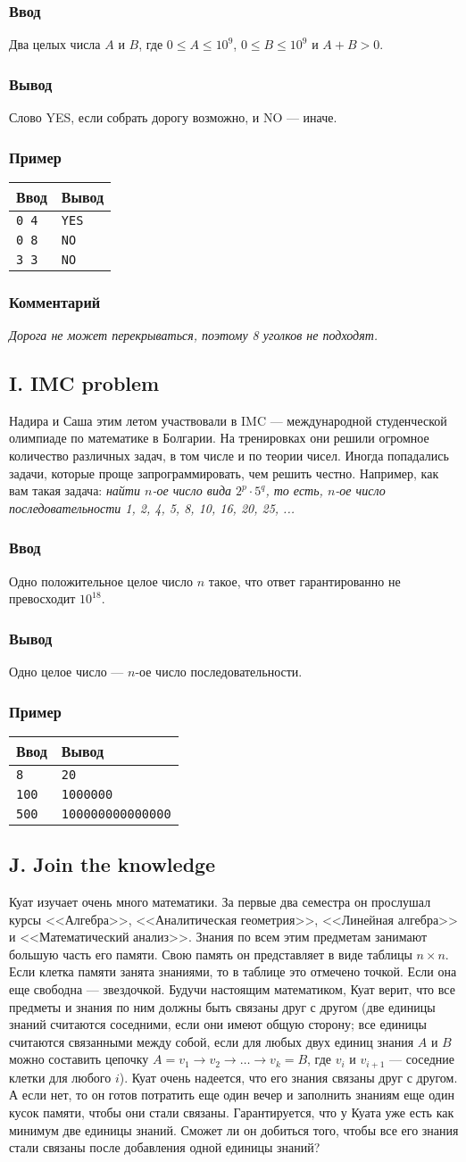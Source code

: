 \documentclass[10pt, a4paper]{article}
\newcommand{\informat}[1]
{
	\subsubsection*{Ввод} #1
}
\newcommand{\outformat}[1]
{
	\subsubsection*{Вывод} #1
}
\newcommand{\exampleee}[6]
{
	\subsubsection*{Пример}
	\noindent
	\begin{center}
	\begin{tabularx}{\linewidth}{|X|X|}
	\hline
	Ввод 	& Вывод  	\\
	\hline
	{\tt #1} & {\tt #2}	\\
	\hline
	{\tt #3} & {\tt #4}	\\
	\hline
	{\tt #5} & {\tt #6}	\\
	\hline
	\end{tabularx}
	\end{center}
}
\newcommand{\excomm}[1]
{
	\subsubsection*{Комментарий}
	\textit{#1}
}
\begin{document}
\informat{Два целых числа $A$ и $B$, где $0 \le A \le 10^9$, $0 \le B \le 10^9$ и $A + B > 0$.}

\outformat{Слово YES, если собрать дорогу возможно, и NO --- иначе.}

\exampleee{0 4}{YES}{0 8}{NO}{3 3}{NO}

\excomm{Дорога не может перекрываться, поэтому 8 уголков не подходят.}


\subsection*{I. IMC problem}

Надира и Саша этим летом участвовали в IMC --- международной студенческой олимпиаде по математике в Болгарии. На тренировках они решили огромное количество различных задач, в том числе и по теории чисел. Иногда попадались задачи, которые проще запрограммировать, чем решить честно. Например, как вам такая задача:\newline
\textit{найти $n$-ое число вида $2^p \cdot 5^q$, то есть, $n$-ое число последовательности 1, 2, 4, 5, 8, 10, 16, 20, 25, ...}

\informat{Одно положительное целое число $n$ такое, что ответ гарантированно не превосходит $10^{18}$.}

\outformat{Одно целое число --- $n$-ое число последовательности.}

\exampleee{8}{20}{100}{1000000}{500}{100000000000000}

\newpage

\subsection*{J. Join the knowledge}

Куат изучает очень много математики. За первые два семестра он прослушал курсы <<Алгебра>>, <<Аналитическая геометрия>>, <<Линейная алгебра>> и <<Математический анализ>>. Знания по всем этим предметам занимают большую часть его памяти. Свою память он представляет в виде таблицы $n \times n$. Если клетка памяти занята знаниями, то в таблице это отмечено точкой. Если она еще свободна --- звездочкой. Будучи настоящим математиком, Куат верит, что все предметы и знания по ним должны быть связаны друг с другом (две единицы знаний считаются соседними, если они имеют общую сторону; все единицы считаются связанными между собой, если для любых двух единиц знания $A$ и $B$ можно составить цепочку $A = v_1 \rightarrow v_2 \rightarrow \dots \rightarrow v_k = B$, где $v_i$ и $v_{i+1}$ --- соседние клетки для любого $i$). Куат очень надеется, что его знания связаны друг с другом. А если нет, то он готов потратить еще один вечер и заполнить знаниям еще один кусок памяти, чтобы они стали связаны. Гарантируется, что у Куата уже есть как минимум две единицы знаний. Сможет ли он добиться того, чтобы все его знания стали связаны после добавления одной единицы знаний?
\end{document}
